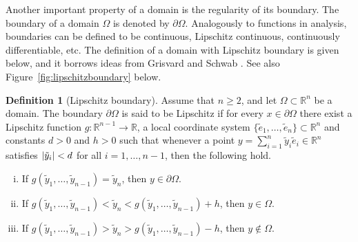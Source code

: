 \documentclass[english, 12pt, a4paper, sci, utf8, a-2b, online]{aaltothesis}
\theoremstyle{definition}
\newtheorem{definition}{Definition}[section]
\theoremstyle{plain}
\DeclarePairedDelimiter\abs{\lvert}{\rvert}
\numberwithin{equation}{section}
\begin{document}
Another important property of a domain is the regularity of its boundary.
The boundary of a domain $\Omega$ is denoted by $\partial \Omega$.
Analogously to functions in analysis, boundaries can be defined to be continuous,
Lipschitz continuous, continuously differentiable, etc.
The definition of a domain with Lipschitz boundary is given below,
and it borrows ideas from
Grisvard \cite{grisvard2011} and Schwab \cite{schwab1998}.
See also Figure~\ref{fig:lipschitzboundary} below.
\begin{definition}[Lipschitz boundary]
    \label{def:lipschitzboundary}
    Assume that $n \geq 2$, and let $\Omega \subset \mathbb{R}^n$ be a domain.
    The boundary $\partial \Omega$ is said to be Lipschitz
    if for every $x \in \partial \Omega$ there exist a Lipschitz function
    $g: \mathbb{R}^{n-1} \to \mathbb{R}$, a local coordinate
    system $\{\tilde{e}_1,\dotsc,\tilde{e}_n\} \subset \mathbb{R}^n$
    and constants $d > 0$ and $h > 0$ such that whenever
    a point $y = \sum_{i=1}^{n} \tilde{y}_i \tilde{e}_i \in \mathbb{R}^n$
    satisfies $\abs{\tilde{y}_i} < d$ for all $i=1,\dotsc,n-1$,
    then the following hold.
    \begin{enumerate}[(i)]
        \item \label{def:lipschitzboundary_cond1}
        If $g(\tilde{y}_1,\dotsc,\tilde{y}_{n-1}) = \tilde{y}_n$,
        then $y \in \partial \Omega$.
        \item \label{def:lipschitzboundary_cond2}
        If $g(\tilde{y}_1,\dotsc,\tilde{y}_{n-1}) < \tilde{y}_n
        < g(\tilde{y}_1,\dotsc,\tilde{y}_{n-1}) + h$, then $y \in \Omega$.
        \item \label{def:lipschitzboundary_cond3}
        If $g(\tilde{y}_1,\dotsc,\tilde{y}_{n-1}) > \tilde{y}_n
        > g(\tilde{y}_1,\dotsc,\tilde{y}_{n-1}) - h$, then $y \notin \Omega$.
    \end{enumerate}
\end{definition}
\end{document}
